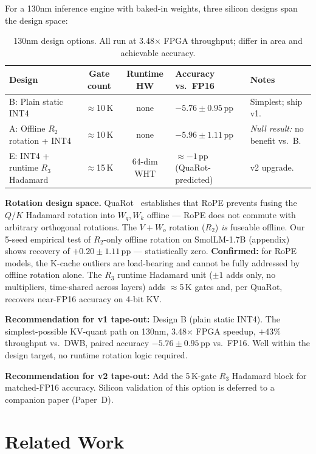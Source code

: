 \documentclass{article}
\begin{document}
For a 130nm inference engine with baked-in weights, three silicon designs span the design space:

\begin{table}[h]
\centering
\caption{130nm design options. All run at 3.48$\times$ FPGA throughput; differ in area and achievable accuracy.}
\begin{tabular}{lccll}
\toprule
Design & Gate count & Runtime HW & Accuracy vs.\ FP16 & Notes \\
\midrule
B: Plain static INT4 & $\approx$10\,K & none & $-5.76\pm0.95$\,pp & Simplest; ship v1. \\
A: Offline $R_2$ rotation + INT4 & $\approx$10\,K & none & $-5.96\pm1.11$\,pp & \emph{Null result:} no benefit vs.\ B. \\
E: INT4 + runtime $R_3$ Hadamard & $\approx$15\,K & 64-dim WHT & $\approx-1$\,pp (QuaRot-predicted) & v2 upgrade. \\
\bottomrule
\end{tabular}
\label{tab:130nm_designs}
\end{table}

\textbf{Rotation design space.} QuaRot~\citep{ashkboos2024quarot} establishes that RoPE prevents fusing the $Q/K$ Hadamard rotation into $W_q, W_k$ offline --- RoPE does not commute with arbitrary orthogonal rotations. The $V + W_o$ rotation ($R_2$) \emph{is} fuseable offline. Our 5-seed empirical test of $R_2$-only offline rotation on SmolLM-1.7B (appendix) shows recovery of $+0.20 \pm 1.11$\,pp --- statistically zero. \textbf{Confirmed:} for RoPE models, the K-cache outliers are load-bearing and cannot be fully addressed by offline rotation alone. The $R_3$ runtime Hadamard unit ($\pm 1$ adds only, no multipliers, time-shared across layers) adds $\approx$5\,K gates and, per QuaRot, recovers near-FP16 accuracy on 4-bit KV.

\textbf{Recommendation for v1 tape-out:} Design B (plain static INT4). The simplest-possible KV-quant path on 130nm, 3.48$\times$ FPGA speedup, $+43\%$ throughput vs.\ DWB, paired accuracy $-5.76\pm0.95$\,pp vs.\ FP16. Well within the design target, no runtime rotation logic required.

\textbf{Recommendation for v2 tape-out:} Add the 5\,K-gate $R_3$ Hadamard block for matched-FP16 accuracy. Silicon validation of this option is deferred to a companion paper (Paper~D).

\section{Related Work}
\end{document}
